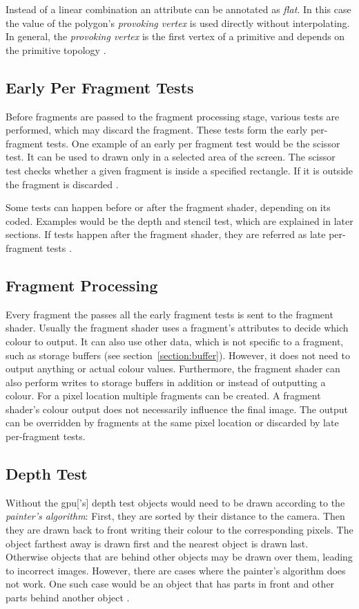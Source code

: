 Instead of a linear combination an attribute can be annotated as \textit{flat}. In this case the value of the polygon's \textit{provoking vertex} is used directly without interpolating. In general, the \textit{provoking vertex} is the first vertex of a primitive and depends on the primitive topology \cite{akine:2018:realtime, khronos:vulkan:spec1.1}.

\subsection{Early Per Fragment Tests}
Before fragments are passed to the fragment processing stage, various tests are performed, which may discard the fragment. These tests form the early per-fragment tests. One example of an early per fragment test would be the scissor test. It can be used to drawn only in a selected area of the screen. The scissor test checks whether a given fragment is inside a specified rectangle. If it is outside the fragment is discarded \cite{khronos:vulkan:spec1.1}. 

Some tests can happen before or after the fragment shader, depending on its coded. Examples would be the depth and stencil test, which are explained in later sections. If tests happen after the fragment shader, they are referred as late per-fragment tests \cite{khronos:vulkan:spec1.1}.

\subsection{Fragment Processing}
\label{section:fragmentprocessing}
Every fragment the passes all the early fragment tests is sent to the fragment shader. Usually the fragment shader uses a fragment's attributes to decide which colour to output.
It can also use other data, which is not specific to a fragment, such as storage buffers (see section~\ref{section:buffer}). However, it does not need to output anything or actual colour values.  Furthermore, the fragment shader can also perform writes to storage buffers in addition or instead of outputting a colour. For a pixel location multiple fragments can be created. A fragment shader's colour output does not necessarily influence the final image. The output can be overridden by fragments at the same pixel location or discarded by late per-fragment tests.


\subsection{Depth Test}
\label{section:depthtest}
Without the \gls{gpu}['s] depth test objects would need to be drawn according to the \textit{painter's algorithm}: First, they are sorted by their distance to the camera. Then they are drawn back to front writing their colour to the corresponding pixels. The object farthest away is drawn first and the nearest object is drawn last. Otherwise objects that are behind other objects may be drawn over them, leading to incorrect images. However, there are cases where the painter's algorithm does not work. One such case would be an object that has parts in front and other parts behind another object \cite{akine:2018:realtime}.

